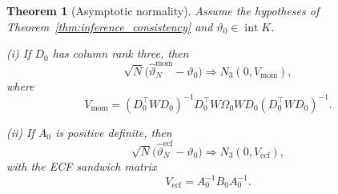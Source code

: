 \documentclass[11pt]{amsart}
\numberwithin{equation}{section}\setcounter{tocdepth}{3}\setcounter{secnumdepth}{3}
\newtheorem{theorem}{Theorem}[section]\newtheorem{proposition}[theorem]{Proposition}
\begin{document}
\begin{theorem}[Asymptotic normality]\label{thm:inference_asymptotic_normality}
Assume the hypotheses of Theorem~\ref{thm:inference_consistency} and
$\vartheta_0\in\operatorname{int}K$.

\emph{(i)} If $D_0$ has column rank three, then
\begin{equation}
 \sqrt N\bigl(\widehat\vartheta_N^{\mathrm{mom}}-\vartheta_0\bigr)
 \Longrightarrow N_3(0,V_{\mathrm{mom}}),
 \label{eq:moment_asymptotic_normality}
\end{equation}
where
\begin{equation}
 V_{\mathrm{mom}}
 =(D_0^\top WD_0)^{-1}D_0^\top W\Omega_0WD_0
 (D_0^\top WD_0)^{-1}.
 \label{eq:moment_sandwich}
\end{equation}

\emph{(ii)} If $A_0$ is positive definite, then
\begin{equation}
 \sqrt N\bigl(\widehat\vartheta_N^{\mathrm{ecf}}-\vartheta_0\bigr)
 \Longrightarrow N_3(0,V_{\mathrm{ecf}}),
 \label{eq:ecf_asymptotic_normality}
\end{equation}
with the ECF sandwich matrix
\begin{equation}
 V_{\mathrm{ecf}}=A_0^{-1}B_0A_0^{-1}.
 \label{eq:ecf_sandwich}
\end{equation}
\end{theorem}
\end{document}
